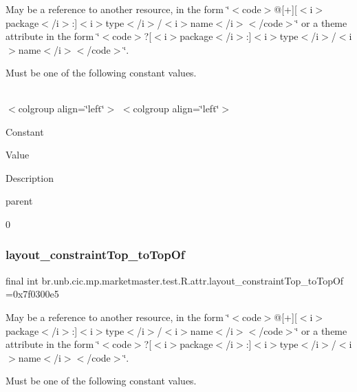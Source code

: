 May be a reference to another resource, in the form \char`\"{}$<$code$>$@\mbox{[}+\mbox{]}\mbox{[}$<$i$>$package$<$/i$>$\+:\mbox{]}$<$i$>$type$<$/i$>$/$<$i$>$name$<$/i$>$$<$/code$>$\char`\"{} or a theme attribute in the form \char`\"{}$<$code$>$?\mbox{[}$<$i$>$package$<$/i$>$\+:\mbox{]}$<$i$>$type$<$/i$>$/$<$i$>$name$<$/i$>$$<$/code$>$\char`\"{}. 

Must be one of the following constant values.

\tabulinesep=1mm
\begin{longtabu} spread 0pt [c]{*{0}{|X[-1]}|}
\hline
\end{longtabu}
$<$colgroup align=\char`\"{}left\char`\"{}$>$ $<$colgroup align=\char`\"{}left\char`\"{}$>$ 

Constant

Value

Description 

parent

0\mbox{\label{classbr_1_1unb_1_1cic_1_1mp_1_1marketmaster_1_1test_1_1R_1_1attr_abf04346292a809168bfa9e66c61bfbe9}} 
\subsubsection{\texorpdfstring{layout\+\_\+constraint\+Top\+\_\+to\+Top\+Of}{layout\_constraintTop\_toTopOf}}
{\footnotesize\ttfamily final int br.\+unb.\+cic.\+mp.\+marketmaster.\+test.\+R.\+attr.\+layout\+\_\+constraint\+Top\+\_\+to\+Top\+Of =0x7f0300e5\hspace{0.3cm}{\ttfamily [static]}}

May be a reference to another resource, in the form \char`\"{}$<$code$>$@\mbox{[}+\mbox{]}\mbox{[}$<$i$>$package$<$/i$>$\+:\mbox{]}$<$i$>$type$<$/i$>$/$<$i$>$name$<$/i$>$$<$/code$>$\char`\"{} or a theme attribute in the form \char`\"{}$<$code$>$?\mbox{[}$<$i$>$package$<$/i$>$\+:\mbox{]}$<$i$>$type$<$/i$>$/$<$i$>$name$<$/i$>$$<$/code$>$\char`\"{}. 

Must be one of the following constant values.

